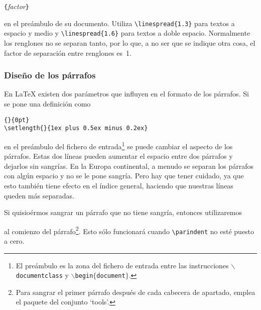 \begin{command}
\verb|{|\emph{factor}\verb|}|
\end{command}

\noindent    en    el    preámbulo   de    su    documento.    Utiliza
\verb|\linespread{1.3}|   para   textos   a    espacio   y   medio   y
\verb|\linespread{1.6}| para  textos a doble espacio.  Normalmente los
renglones  no  se  separan  tanto,  por  lo  que,  a  no  ser  que  se
indique  otra cosa,  el factor  de separación  entre renglones  es~1.%

\subsubsection{Diseño de los párrafos}\label{parsp}

En \LaTeX{} existen  dos parámetros que influyen en el  formato de los
párrafos. Si se pone una definición como

\begin{code}
\verb|{|\verb|}{0pt}| \\
\verb|\setlength{|\verb|}{1ex plus 0.5ex minus 0.2ex}|
\end{code}

\noindent en    el     preámbulo    del    fichero     de    entrada\footnote{El
preámbulo     es     la     zona    del     fichero     de     entrada
entre     las     instrucciones     $\backslash$\texttt{documentclass}
y   $\backslash$\texttt{begin$\mathtt{\{}$document$\mathtt{\}}$}.}  se
puede  cambiar el  aspecto de  los párrafos.  Estas dos  líneas pueden
aumentar el espacio entre dos párrafos  y dejarlos sin sangrías. En la
Europa continental, a menudo se separan los párrafos con algún espacio
y no  se le  pone sangría.  Pero hay  que tener  cuidado, ya  que esto
también  tiene efecto  en  el índice  general,  haciendo que  nuestras
líneas queden más separadas.

Si  quisioérmos sangrar  un  párrafo que  no  tiene sangría,  entonces
utilizaremos

\begin{command}
\end{command}

\noindent  al comienzo  del  párrafo\footnote{Para  sangrar el  primer
párrafo  después  de cada  cabecera  de  apartado, emplea  el  paquete
 del conjunto `tools'.}.  Esto sólo funcionará cuando
\verb|\parindent| no esté puesto a cero.

